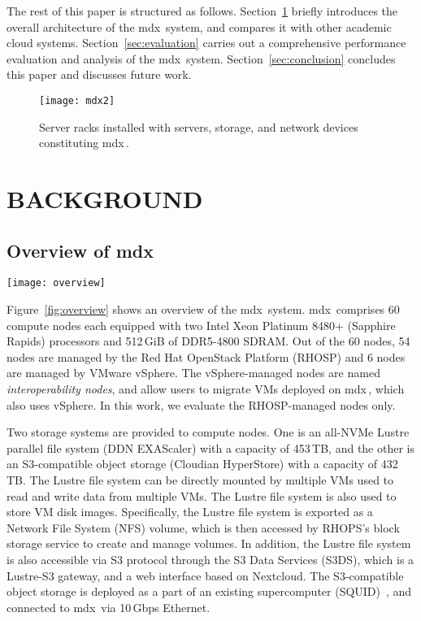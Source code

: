 \documentclass[a4paper,twoside]{article}
\newcommand{\mdx}{mdx\,\uppercase\expandafter{\romannumeral 2\relax}}
\newcommand{\mdxone}{mdx\,\uppercase\expandafter{\romannumeral 1\relax}}
\begin{document}
The rest of this paper is structured as follows. Section~\ref{sec:background} briefly introduces the
overall architecture of the \mdx{} system, and compares it with other academic cloud systems.
Section~\ref{sec:evaluation} carries out a comprehensive performance evaluation and analysis of the
\mdx{} system. Section~\ref{sec:conclusion} concludes this paper and discusses future work.

\begin{figure}
    \centering
    \texttt{[image: mdx2]}%
    \caption{Server racks installed with servers, storage, and network devices constituting \mdx{}.}\label{fig:rack}
\end{figure}

\section{\uppercase{Background}}%
\label{sec:background}

\subsection{Overview of \mdx{}}

\begin{figure*}
\centering
\texttt{[image: overview]}%
\caption{Overall architecture of \mdx{}.}\label{fig:overview}
\end{figure*}

Figure~\ref{fig:overview} shows an overview of the \mdx{} system. \mdx{} comprises 60 compute nodes 
each equipped with two Intel Xeon Platinum 8480+ (Sapphire Rapids) processors and 512\,GiB of
DDR5-4800 SDRAM. Out of the 60 nodes, 54 nodes are managed by the Red Hat OpenStack Platform (RHOSP)
and 6 nodes are managed by VMware vSphere. The vSphere-managed nodes are named
\emph{interoperability nodes}, and allow users to migrate VMs deployed on \mdxone{}, which also
uses vSphere. In this work, we evaluate the RHOSP-managed nodes only.

Two storage systems are provided to compute nodes. One is an all-NVMe Lustre parallel file system
(DDN EXAScaler) with a capacity of 453\,TB, and the other is an S3-compatible object storage
(Cloudian HyperStore) with a capacity of 432\,TB. The Lustre file system can be directly mounted by
multiple VMs used to read and write data from multiple VMs. The Lustre file system is also
used to store VM disk images. Specifically, the Lustre file system is exported as a Network File
System (NFS) volume, which is then accessed by RHOPS's block storage service to create and manage
volumes. In addition, the Lustre file system is also accessible via S3 protocol through the S3 Data
Services (S3DS), which is a Lustre-S3 gateway, and a web interface based on Nextcloud. The
S3-compatible object storage is deployed as a part of an existing supercomputer
(SQUID)~\cite{Date2023}, and connected to \mdx{} via 10\,Gbps Ethernet.
\end{document}
